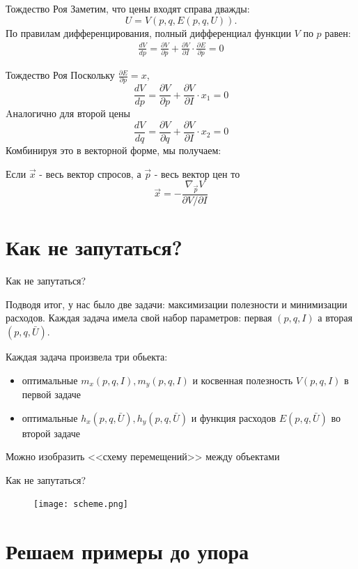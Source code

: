\documentclass{beamer}
\begin{document}

\begin{frame}{Тождество Роя}
Заметим, что цены входят справа дважды:
$$U = V(p, q, E(p,q,U)).$$
По правилам дифференцирования, полный дифференциал функции $V$ по $p$ равен:
\begin{gather*}
\frac{d V}{d p} = \frac{\partial V}{\partial p} + \frac{\partial V}{\partial I} \cdot \frac{\partial E}{\partial p} = 0
\end{gather*}

\end{frame}

\begin{frame}{Тождество Роя}
Поскольку $\frac{\partial E}{\partial p} = x$, 
$$\frac{d V}{d p} = \frac{\partial V}{\partial p} + \frac{\partial V}{\partial I} \cdot x_1 = 0$$
Aналогично для второй цены
$$\frac{d V}{d q} = \frac{\partial V}{\partial q} + \frac{\partial V}{\partial I} \cdot x_2 = 0$$
Комбинируя это в векторной форме, мы получаем:

\begin{theorem}
Если $\vec{x}$ - весь вектор спросов, а $\vec{p}$ - весь вектор цен то
$$\vec{x} = - \frac{\nabla_{\vec{p}} V}{\partial V / \partial I } $$
\end{theorem}

\end{frame}

\section{Как не запутаться?}

\begin{frame}{Как не запутаться?}

Подводя итог, у нас было две задачи: максимизации полезности и минимизации расходов. Каждая задача имела свой набор параметров: первая $(p,q,I)$ а вторая $(p,q,\bar U)$. 

Каждая задача произвела три обьекта:

\begin{itemize}
\item оптимальные $m_x(p,q,I), m_y(p,q,I)$ и косвенная полезность $V(p,q,I)$ в первой задаче
\item оптимальные $h_x(p,q,\bar U), h_y(p,q,\bar U)$ и функция расходов $E(p,q,\bar U)$ во второй задаче
\end{itemize}
Можно изобразить <<схему перемещений>> между объектами

\end{frame}

\begin{frame}{Как не запутаться?}

\begin{figure}[hbt]
\centering
\texttt{[image: scheme.png]}
\end{figure}

\end{frame}

\section{Решаем примеры до упора}
\end{document}
